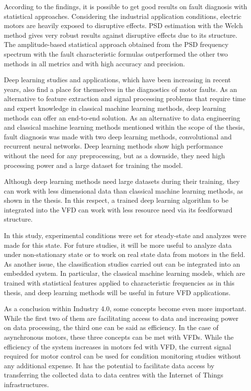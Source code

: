According to the findings, it is possible to get good results on fault diagnosis with statistical approaches. Considering the industrial application conditions,  electric motors are heavily exposed to disruptive effects. PSD estimation with the Welch method gives very robust results against disruptive effects due to its structure. The amplitude-based statistical approach obtained from the PSD frequency spectrum with the fault characteristic formulas outperformed the other two methods in all metrics and with high accuracy and precision.

Deep learning studies and applications, which have been increasing in recent years, also find a place for themselves in the diagnostics of motor faults. As an alternative to feature extraction and signal processing problems that require time and expert knowledge in classical machine learning methods, deep learning methods can offer an end-to-end solution. As an alternative to data engineering and classical machine learning methods mentioned within the scope of the thesis, fault diagnosis was made with two deep learning methods, convolutional and recurrent neural networks. Deep learning methods show high performance without the need for any preprocessing, but as a downside, they need high processing power and a large dataset for training the model.

Although deep learning methods need large datasets during their training, they can work with less dimensional data than classical machine learning methods, as shown in the thesis. In this respect, a trained deep learning algorithm to be integrated into the VFD can work with less resource need via its feedforward structure.

In this study, experimental conditions were set for steady-state and analyzes were made for this state. For future studies, it will be more useful to analyze data under non-stationary state or to work on real state data from motors in the field. As another issue, the classification studies carried out can be integrated into an embedded system. In particular, the classical machine learning models, which are trained with statistical features applied to characteristic frequencies as in this thesis, and deep learning methods will be useful in future VFD applications.

As a conclusion within Industry 4.0, some concepts become even more important. While the first two of them are facilitating access to data and increasing power on data processing, the third one can be said as efficiency. In the case of asynchronous motors, these three concepts can be met with VFDs. While the efficiency of the system increases in motors fed with VFD, the current signal required for motor control can be used for condition monitoring studies without any additional expense. It has the potential to facilitate data access by transferring the collected data to data centres with the Internet of Things infrastructures.